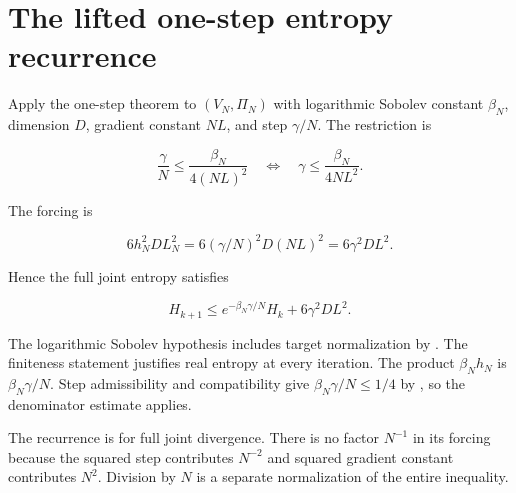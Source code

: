 \documentclass[11pt,a4paper]{report}
\begin{document}
\section{\texorpdfstring{The lifted one-step entropy recurrence}{The lifted one-step entropy recurrence}}


Apply the one-step theorem \cite[Section~3.29.6]{LangevinLean2026ULALSI} to \((V_N,\Pi_N)\) with logarithmic Sobolev constant \(\beta_N\), dimension \(D\), gradient constant \(NL\), and step \(\gamma/N\). The restriction is

\[\frac\gamma N\le\frac{\beta_N}{4(NL)^2}
\quad\Longleftrightarrow\quad
\gamma\le\frac{\beta_N}{4NL^2}.\]

The forcing is

\[6h_N^2D L_N^2=6(\gamma/N)^2D(NL)^2=6\gamma^2DL^2.\]

Hence the full joint entropy satisfies

\[H_{k+1}\le e^{-\beta_N\gamma/N}H_k+6\gamma^2DL^2.\]

The logarithmic Sobolev hypothesis includes target normalization by \cite[Section~3.1.3]{LangevinLean2026ULALSI}. The finiteness statement \cite[Section~3.29.2]{LangevinLean2026ULALSI} justifies real entropy at every iteration. The product \(\beta_Nh_N\) is \(\beta_N\gamma/N\). Step admissibility and compatibility give \(\beta_N\gamma/N\le1/4\) by \cite[Section~3.6.9]{LangevinLean2026ULALSI}, so the denominator estimate \cite[Section~3.20.2]{LangevinLean2026ULALSI} applies.



The recurrence is for full joint divergence. There is no factor \(N^{-1}\) in its forcing because the squared step contributes \(N^{-2}\) and squared gradient constant contributes \(N^2\). Division by \(N\) is a separate normalization of the entire inequality.
\end{document}
